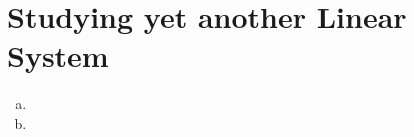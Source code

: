 \section{Studying yet another Linear System}\label{sec:p2}

\begin{enumerate}[(a)]
	\item 
	\item 
\end{enumerate}